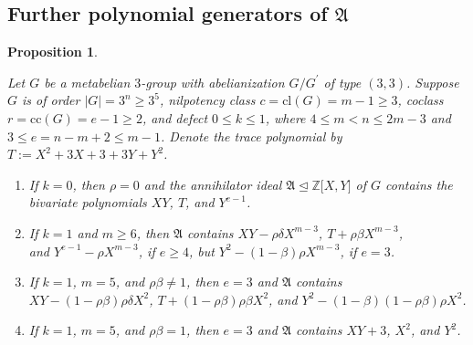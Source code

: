 \documentclass{amsart}
\newtheorem{proposition}{Proposition}[section]
\theoremstyle{definition}
\numberwithin{equation}{section}
\begin{document}
\subsection{Further polynomial generators of \(\mathfrak{A}\)}
\label{ss:LowFurtherPolynomials}

\begin{proposition}
\label{prp:LowFurtherPolynomials}

Let \(G\) be a metabelian \(3\)-group with abelianization \(G/G^\prime\) of type \((3,3)\).
Suppose \(G\) is of order \(\lvert G\rvert=3^n\ge 3^5\), nilpotency class \(c=\mathrm{cl}(G)=m-1\ge 3\), coclass \(r=\mathrm{cc}(G)=e-1\ge 2\),
and defect \(0\le k\le 1\), where \(4\le m<n\le 2m-3\) and \(3\le e=n-m+2\le m-1\).
Denote the \textit{trace polynomial} by \(T:=X^2+3X+3+3Y+Y^2\).

\begin{enumerate}

\item
If \(k=0\), then \(\rho=0\) and
the annihilator ideal \(\mathfrak{A}\unlhd\mathbb{Z}\lbrack X,Y\rbrack\) of \(G\)
contains the bivariate polynomials \(XY\), \quad \(T\), \quad and \(Y^{e-1}\).

\item
If \(k=1\) and \(m\ge 6\),
then \(\mathfrak{A}\) contains
\(XY-\rho\delta X^{m-3}\), \quad \(T+\rho\beta X^{m-3}\), \\
\quad and \(Y^{e-1}-\rho X^{m-3}\), if \(e\ge 4\), \quad but \(Y^2-(1-\beta)\rho X^{m-3}\), if \(e=3\).

\item
If \(k=1\), \(m=5\), and \(\rho\beta\ne 1\),
then \(e=3\) and \(\mathfrak{A}\) contains\\
\(XY-(1-\rho\beta)\rho\delta X^2\), \quad \(T+(1-\rho\beta)\rho\beta X^2\), \quad
and \(Y^2-(1-\beta)(1-\rho\beta)\rho X^2\).

\item
If \(k=1\), \(m=5\), and \(\rho\beta=1\),
then \(e=3\) and \(\mathfrak{A}\) contains
\(XY+3\), \quad \(X^2\), \quad and \(Y^2\).

\end{enumerate}

\end{proposition}
\end{document}
